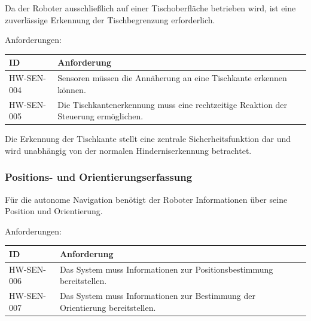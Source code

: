 Da der Roboter ausschließlich auf einer Tischoberfläche betrieben wird,
ist eine zuverlässige Erkennung der Tischbegrenzung erforderlich.

Anforderungen:

\begin{longtable}[]{@{}
  >{\raggedright\arraybackslash}p{}
  >{\raggedright\arraybackslash}p{}@{}}
\toprule\noalign{}
\begin{minipage}[b]{\linewidth}\raggedright
ID
\end{minipage} & \begin{minipage}[b]{\linewidth}\raggedright
Anforderung
\end{minipage} \\
\midrule\noalign{}
\endhead
\bottomrule\noalign{}
\endlastfoot
HW-SEN-004 & Sensoren müssen die Annäherung an eine Tischkante erkennen
können. \\
HW-SEN-005 & Die Tischkantenerkennung muss eine rechtzeitige Reaktion
der Steuerung ermöglichen. \\
\end{longtable}

Die Erkennung der Tischkante stellt eine zentrale Sicherheitsfunktion
dar und wird unabhängig von der normalen Hinderniserkennung betrachtet.

\subsubsection{Positions- und
Orientierungserfassung}\label{positions--und-orientierungserfassung}

Für die autonome Navigation benötigt der Roboter Informationen über
seine Position und Orientierung.

Anforderungen:

\begin{longtable}[]{@{}
  >{\raggedright\arraybackslash}p{}
  >{\raggedright\arraybackslash}p{}@{}}
\toprule\noalign{}
\begin{minipage}[b]{\linewidth}\raggedright
ID
\end{minipage} & \begin{minipage}[b]{\linewidth}\raggedright
Anforderung
\end{minipage} \\
\midrule\noalign{}
\endhead
\bottomrule\noalign{}
\endlastfoot
HW-SEN-006 & Das System muss Informationen zur Positionsbestimmung
bereitstellen. \\
HW-SEN-007 & Das System muss Informationen zur Bestimmung der
Orientierung bereitstellen. \\
\end{longtable}

